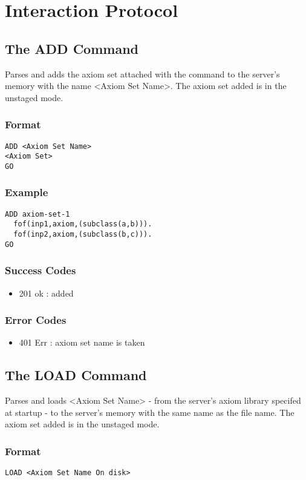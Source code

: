 \chapter{Interaction Protocol}\label{chap:interactionProtocol}

\section{The ADD Command}
Parses and adds the axiom set attached with the command to the server's memory with the name <Axiom Set Name>. The axiom set added is in the unstaged mode.
\subsection{Format}
\begin{lstlisting}
ADD <Axiom Set Name>
<Axiom Set>
GO
\end{lstlisting}
\subsection{Example}
\begin{lstlisting}
ADD axiom-set-1
  fof(inp1,axiom,(subclass(a,b))).
  fof(inp2,axiom,(subclass(b,c))).
GO
\end{lstlisting}
\subsection{Success Codes}
\begin{itemize}
    \item 201 ok : added
\end{itemize}
\subsection{Error Codes}
\begin{itemize}
    \item 401 Err : axiom set name is taken
\end{itemize}
\clearpage

\section{The LOAD Command}
Parses and loads <Axiom Set Name> - from the server's axiom library specifed at startup - to the server's memory with the same name as the file name. The axiom set added is in the unstaged mode.
\subsection{Format}
\begin{lstlisting}
LOAD <Axiom Set Name On disk>
\end{lstlisting}

